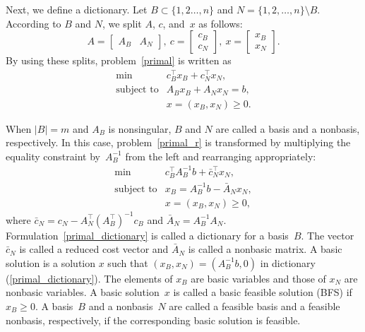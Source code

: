 \documentclass[12pt]{article}
\begin{document}
Next, we define a dictionary. 
Let $B\subset\{1,2\dots,n\}$ and $N=\{1,2,\dots,n\}\setminus B$.
According to $B$ and $N$, we split $A$, $c$, and~$x$ as follows:
\[
A= \begin{bmatrix}
    A_B & A_N
  \end{bmatrix},~
  c = \begin{bmatrix}
    c_B\\
    c_N
  \end{bmatrix},~
  x = \begin{bmatrix}
    x_B\\
    x_N
  \end{bmatrix}.
\]
By using these splits, problem~\eqref{primal} is written as
\begin{equation} \label{primal_r}
\begin{array}{ll}
\min&c_B^{\top}x_B+c_N^{\top}x_N,\\
\text{subject to}&A_Bx_B+A_Nx_N=b,\\
&x=(x_B,x_N)\ge0.
\end{array}
\end{equation}


When $|B| = m$ and $A_B$ is nonsingular, $B$ and $N$ are called a basis and a nonbasis, respectively. 
In this case, problem~\eqref{primal_r} is transformed by multiplying the equality constraint by~$A_B^{-1}$ from the left
and rearranging appropriately:
\begin{equation} \label{primal_dictionary}
\begin{array}{ll}
\min& c_B^{\top}A_B^{-1}b+\bar{c}_N^{\top}x_N,\\
\text{subject~to}&x_B=A_B^{-1}b-\bar{A}_Nx_N,\\
&x=(x_B,x_N)\ge0,
\end{array}
\end{equation}
where $\bar{c}_N = c_N - A_N^{\top} (A_B^{\top})^{-1}c_B$ and $\bar{A}_N = A_B^{-1} A_N$.
Formulation~\eqref{primal_dictionary} is called a dictionary for a basis~$B$.
The vector $\bar{c}_N$ is called a reduced cost vector and $\bar{A}_N$ is called a nonbasic matrix.
%
A basic solution is a solution $x$ such that $(x_B,x_N) = (A_B^{-1}b, 0)$ in dictionary (\ref{primal_dictionary}).
The elements of $x_B$ are basic variables and those of $x_N$ are nonbasic variables.
A basic solution~$x$ is called a basic feasible solution (BFS) if $x_B\ge0$.
A basis~$B$ and a nonbasis~$N$ are called a feasible basis and a feasible nonbasis, respectively, if the corresponding basic solution is feasible.\\
\end{document}
